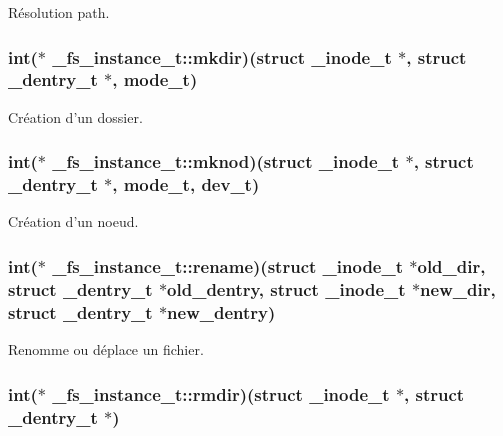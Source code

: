 Résolution path. \hypertarget{struct__fs__instance__t_a705d100026840b619f217931dc8419f3}{
\subsubsection[{mkdir}]{\setlength{\rightskip}{0pt plus 5cm}int($\ast$ \+\_\+fs\+\_\+instance\+\_\+t\+::mkdir)(struct {\bf \+\_\+inode\+\_\+t} $\ast$, struct {\bf \+\_\+dentry\+\_\+t} $\ast$, {\bf mode\+\_\+t})}}\label{struct__fs__instance__t_a705d100026840b619f217931dc8419f3}
Création d'un dossier. \hypertarget{struct__fs__instance__t_ae57436a3bfd6de530204a67a8ac2f4f0}{
\subsubsection[{mknod}]{\setlength{\rightskip}{0pt plus 5cm}int($\ast$ \+\_\+fs\+\_\+instance\+\_\+t\+::mknod)(struct {\bf \+\_\+inode\+\_\+t} $\ast$, struct {\bf \+\_\+dentry\+\_\+t} $\ast$, {\bf mode\+\_\+t}, {\bf dev\+\_\+t})}}\label{struct__fs__instance__t_ae57436a3bfd6de530204a67a8ac2f4f0}
Création d'un noeud. \hypertarget{struct__fs__instance__t_a62e37513c47dda9d11e534cf84d6f48b}{
\subsubsection[{rename}]{\setlength{\rightskip}{0pt plus 5cm}int($\ast$ \+\_\+fs\+\_\+instance\+\_\+t\+::rename)(struct {\bf \+\_\+inode\+\_\+t} $\ast$old\+\_\+dir, struct {\bf \+\_\+dentry\+\_\+t} $\ast$old\+\_\+dentry, struct {\bf \+\_\+inode\+\_\+t} $\ast$new\+\_\+dir, struct {\bf \+\_\+dentry\+\_\+t} $\ast$new\+\_\+dentry)}}\label{struct__fs__instance__t_a62e37513c47dda9d11e534cf84d6f48b}
Renomme ou déplace un fichier. \hypertarget{struct__fs__instance__t_a4ceb71ff00d0a5fda03aa644c4694bef}{
\subsubsection[{rmdir}]{\setlength{\rightskip}{0pt plus 5cm}int($\ast$ \+\_\+fs\+\_\+instance\+\_\+t\+::rmdir)(struct {\bf \+\_\+inode\+\_\+t} $\ast$, struct {\bf \+\_\+dentry\+\_\+t} $\ast$)}}\label{struct__fs__instance__t_a4ceb71ff00d0a5fda03aa644c4694bef}
